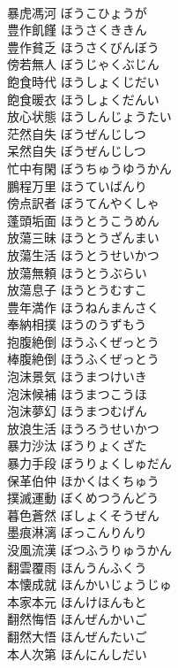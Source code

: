 \documentclass[8pt]{extreport}
\begin{document}
\begin{CJK}{UTF8}{min}
\\	暴虎馮河	ぼうこひょうが	
\\	豊作飢饉	ほうさくききん	
\\	豊作貧乏	ほうさくびんぼう	
\\	傍若無人	ぼうじゃくぶじん	
\\	飽食時代	ほうしょくじだい	
\\	飽食暖衣	ほうしょくだんい	
\\	放心状態	ほうしんじょうたい	
\\	茫然自失	ぼうぜんじしつ	
\\	呆然自失	ぼうぜんじしつ	
\\	忙中有閑	ぼうちゅうゆうかん	
\\	鵬程万里	ほうていばんり	
\\	傍点訳者	ぼうてんやくしゃ	
\\	蓬頭垢面	ほうとうこうめん	
\\	放蕩三昧	ほうとうざんまい	
\\	放蕩生活	ほうとうせいかつ	
\\	放蕩無頼	ほうとうぶらい	
\\	放蕩息子	ほうとうむすこ	
\\	豊年満作	ほうねんまんさく	
\\	奉納相撲	ほうのうずもう	
\\	抱腹絶倒	ほうふくぜっとう	
\\	棒腹絶倒	ほうふくぜっとう	
\\	泡沫景気	ほうまつけいき	
\\	泡沫候補	ほうまつこうほ	
\\	泡沫夢幻	ほうまつむげん	
\\	放浪生活	ほうろうせいかつ	
\\	暴力沙汰	ぼうりょくざた	
\\	暴力手段	ぼうりょくしゅだん	
\\	保革伯仲	ほかくはくちゅう	
\\	撲滅運動	ぼくめつうんどう	
\\	暮色蒼然	ぼしょくそうぜん	
\\	墨痕淋漓	ぼっこんりんり	
\\	没風流漢	ぼつふうりゅうかん	
\\	翻雲覆雨	ほんうんふくう	
\\	本懐成就	ほんかいじょうじゅ	
\\	本家本元	ほんけほんもと	
\\	翻然悔悟	ほんぜんかいご	
\\	翻然大悟	ほんぜんたいご	
\\	本人次第	ほんにんしだい	

\end{CJK}
\end{document}
